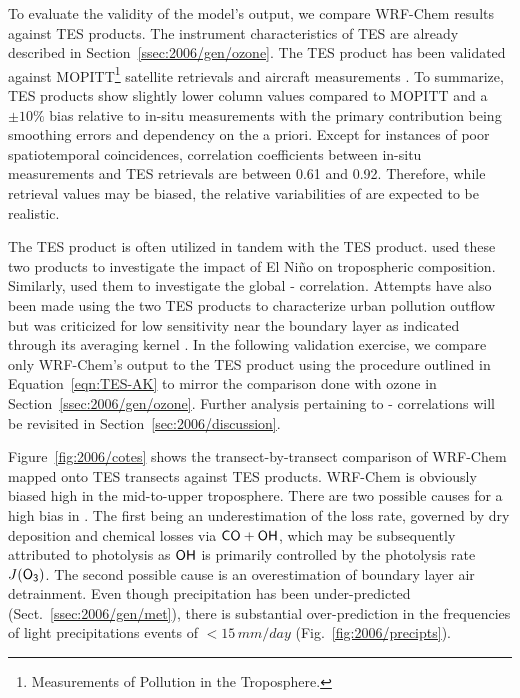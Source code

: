 To evaluate the validity of the model's  output, we compare WRF-Chem results against TES  products. The instrument characteristics of TES are
already described in Section~\ref{ssec:2006/gen/ozone}. The TES  product has been validated against MOPITT\footnote{Measurements of Pollution in
the Troposphere.} satellite retrievals \citep{Luo:2007ly,Ho:2009lh} and aircraft measurements \citep{Luo:2007vn,Lopez:2008ys}. To summarize, TES 
products show slightly lower column  values compared to MOPITT and a $\pm10\%$ bias relative to in-situ measurements with
the primary contribution being smoothing errors and dependency on the a priori. Except for instances of poor spatiotemporal coincidences, correlation
coefficients between in-situ measurements and TES retrievals are between 0.61 and 0.92. Therefore, while retrieval values may be biased, the relative variabilities
of   are expected to be realistic.


The TES  product is often utilized in tandem with the TES  product. \citet{Logan:2008uq} used these two products to investigate the impact
of El Ni\~no on tropospheric composition. Similarly, \citet{Voulgarakis:2011fk} used them to investigate the global - correlation. Attempts
have also been made using the two TES products to characterize urban pollution outflow but was criticized for low sensitivity near the boundary layer as indicated
through its averaging kernel \citep{Shim:2007kx}. In the following validation exercise, we compare only WRF-Chem's output to the TES 
product using the procedure outlined in Equation~\ref{eqn:TES-AK} to mirror the comparison done with ozone in Section~\ref{ssec:2006/gen/ozone}.  Further
analysis pertaining to - correlations will be revisited in Section~\ref{sec:2006/discussion}.
	
Figure~\ref{fig:2006/cotes} shows the transect-by-transect comparison of WRF-Chem  mapped onto TES transects against TES 
products. WRF-Chem is obviously biased high in the mid-to-upper troposphere. There are two possible causes for a high bias in . The first being an
underestimation of the loss rate, governed by dry deposition and chemical losses via $\chem{CO}+\chem{OH}$, which may be subsequently attributed to photolysis as
$\chem{OH}$ is primarily controlled by the photolysis rate $J(\chem{O_3})$. The second possible cause is an overestimation of boundary layer air detrainment. Even though precipitation has been
under-predicted (Sect.~\ref{ssec:2006/gen/met}), there is substantial over-prediction in the frequencies of light precipitations events of $<15\,\unit{mm/day}$ (Fig.~\ref{fig:2006/precipts}).

